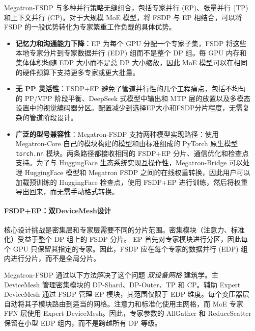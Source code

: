 Megatron-FSDP 与多种并行策略无缝组合，包括专家并行 (EP)、张量并行 (TP) 和上下文并行 (CP)。对于大规模 MoE 模型，将 FSDP 与 EP 相结合，可以将 FSDP 的一般优势转化为专家繁重工作负载的具体优势。

\begin{itemize}[itemsep=2pt]
  \item \textbf{记忆力和沟通能力下降}：EP 为每个 GPU 分配一个专家子集，FSDP 将这些本地专家分片到专家数据并行 (EDP) 组而不是整个 DP 组。每 GPU 内存和集体体积均随 EDP 大小而不是总 DP 大小缩放，因此 MoE 模型可以在相同的硬件预算下支持更多专家或更大批量。

  \item \textbf{无 PP 灵活性}：FSDP+EP 避免了管道并行性的几个工程痛点，包括不均匀的 PP/VPP 阶段平衡、DeepSeek 式模型中输出和 MTP 层的放置以及多模态设置中的视觉编码器分区。配置减少到选择EP大小和FSDP分片程度，无需复杂的管道阶段设计。

  \item \textbf{广泛的型号兼容性}：Megatron-FSDP 支持两种模型实现路径：使用 Megatron-Core 自己的模块构建的模型和由标准组成的 PyTorch 原生模型 \texttt{torch.nn} 模块。两条路径都接收相同的 FSDP+EP 分片、通信优化和检查点支持。为了与 HuggingFace 生态系统实现互操作性，Megatron-Bridge 可以处理 HuggingFace 模型和 Megatron FSDP 之间的在线权重转换，因此用户可以加载预训练的 HuggingFace 检查点，使用 FSDP+EP 进行训练，然后将权重导出回来，而无需手动格式转换。
\end{itemize}

\paragraph{FSDP+EP：双DeviceMesh设计}

核心设计挑战是密集层和专家层需要不同的分片范围。密集模块（注意力、标准化）受益于整个 DP 组上的 FSDP 分片。 EP 首先对专家模块进行分区，因此每个 GPU 只保留其指定的专家。因此，FSDP 应在每个专家的数据并行 (EDP) 组内进行分片，而不是全局分片。

Megatron-FSDP 通过以下方法解决了这个问题 \emph{双设备网格} 建筑学。主 DeviceMesh 管理密集模块的 DP-Shard、DP-Outer、TP 和 CP。辅助 Expert DeviceMesh 通过 FSDP 管理 EP 模块，其范围仅限于 EDP 维度。每个变压器层自动将其子模块路由到适当的网格。注意力和标准化使用主网格，而 MoE 专家 FFN 层使用 Expert DeviceMesh。因此，专家参数的 AllGather 和 ReduceScatter 保留在小型 EDP 组内，而不是跨越所有 DP 等级。


